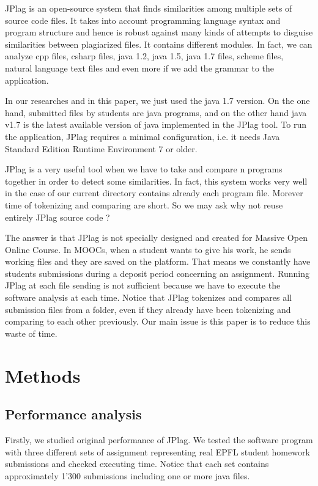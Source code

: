 \documentclass[twoside]{article}
\begin{document}
\begin{multicols*}{2}
JPlag is an open-source system that finds similarities among multiple sets of source code files. It takes into account programming language syntax and program structure and hence is robust against many kinds of attempts to disguise similarities between plagiarized files. It contains different modules. In fact, we can analyze cpp files, csharp files, java 1.2, java 1.5, java 1.7 files, scheme files, natural language text files and even more if we add the grammar to the application. 

In our researches and in this paper, we just used the java 1.7 version. On the one hand, submitted files by students are java programs, and on the other hand java v1.7 is the latest available version of java implemented in the JPlag tool. To run the application, JPlag requires a minimal configuration, i.e. it needs Java Standard Edition Runtime Environment 7 or older.   

JPlag is a very useful tool when we have to take and compare n programs together in order to detect some similarities. In fact, this system works very well in the case of our current directory contains already each program file. Morever time of tokenizing and comparing are short. So we may ask why not reuse entirely JPlag source code ? 

The answer is that JPlag is not specially designed and created for Massive Open Online Course. In MOOCs, when a student wants to give his work, he sends working files and they are saved on the platform. That means we constantly have students submissions during a deposit period concerning an assignment. Running JPlag at each file sending is not sufficient because we have to execute the software analysis at each time. Notice that JPlag tokenizes and compares all submission files from a folder, even if they already have been tokenizing and comparing to each other previously. Our main issue is this paper is to reduce this waste of time. 

\vspace{0.5cm}
\section{Methods}

\subsection{Performance analysis}

Firstly, we studied original performance of JPlag. We tested the software program with three different sets of assignment representing real EPFL student homework submissions and checked executing time. Notice that each set contains approximately 1'300 submissions including one or more java files. 


\end{multicols*}
\end{document}
